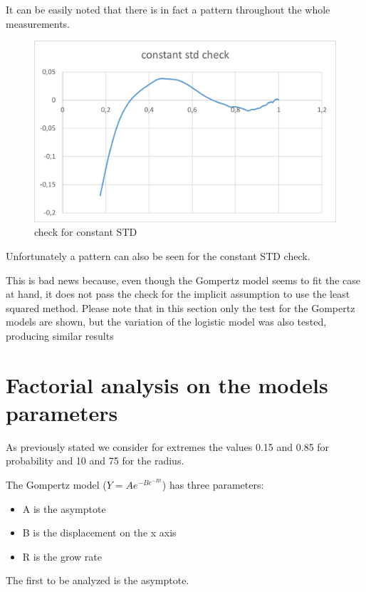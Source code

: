 It can be easily noted that there is in fact a pattern throughout the whole measurements.
\begin{figure}[H]
\centering
    \includegraphics[width= 1\textwidth]{./images/ConstantSTDCheck200.png}
    \caption{check for constant STD}
    \label{fig:STDCheckGompertz}
\end{figure}

Unfortunately a pattern can also be seen for the constant STD check. 

This is bad news because, even though the Gompertz model seems to fit the case at hand, it does not pass the check for the implicit assumption to use the least squared method.
Please note that in this section only the test for the Gompertz models are shown, but the variation of the logistic model was also tested, producing similar results

\iffalse
\section{Factorial analysis on the models parameters}
As previously stated we consider for extremes the values 0.15 and 0.85 for probability and 10 and 75 for the radius.

The Gompertz model ($ Y = Ae^{-Be^{-Rt}} $) has three parameters:
\begin{itemize}
	\item A is the asymptote
	\item B is the displacement on the x axis
	\item R is the grow rate
\end{itemize}
The first to be analyzed is the asymptote.

